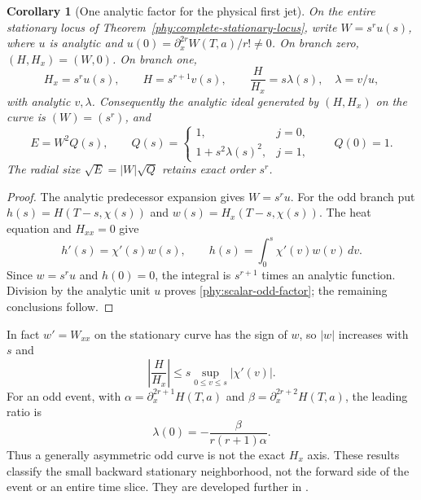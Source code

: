 \documentclass[11pt]{article}
\numberwithin{equation}{section}
\newtheorem{corollary}[theorem]{Corollary}
\theoremstyle{definition}
\theoremstyle{remark}
\begin{document}
\begin{corollary}[One analytic factor for the physical first jet]
\label{phy:scalar-stationary-factor}
On the entire stationary locus of
Theorem~\ref{phy:complete-stationary-locus}, write
$W=s^ru(s)$, where $u$ is analytic and
$u(0)=\partial_x^{2r}W(T,a)/r!\ne0$.
On branch zero, $(H,H_x)=(W,0)$. On branch one,
\begin{equation}
 H_x=s^ru(s),\qquad H=s^{r+1}v(s),\qquad
 \frac{H}{H_x}=s\lambda(s),\quad \lambda=v/u,
 \label{phy:scalar-odd-factor}
\end{equation}
with analytic $v,\lambda$. Consequently the analytic ideal generated
by $(H,H_x)$ on the curve is $(W)=(s^r)$, and
\begin{equation}
 E=W^2Q(s),\qquad
 Q(s)=\begin{cases}1,&j=0,\\1+s^2\lambda(s)^2,&j=1,\end{cases}
 \qquad Q(0)=1.
 \label{phy:scalar-energy-factor}
\end{equation}
The radial size $\sqrt E=|W|\sqrt Q$ retains exact order $s^r$.
\end{corollary}
\begin{proof}
The analytic predecessor expansion gives $W=s^ru$.
For the odd branch put $h(s)=H(T-s,\chi(s))$ and
$w(s)=H_x(T-s,\chi(s))$. The heat equation and $H_{xx}=0$ give
\begin{equation}
 h'(s)=\chi'(s)w(s),\qquad
 h(s)=\int_0^s\chi'(v)w(v)\,dv.
 \label{phy:odd-stationary-transport}
\end{equation}
Since $w=s^ru$ and $h(0)=0$, the integral is $s^{r+1}$ times
an analytic function. Division by the analytic unit $u$ proves
\eqref{phy:scalar-odd-factor}; the remaining conclusions follow.
\end{proof}

In fact $w'=W_{xx}$ on the stationary curve has the sign of $w$,
so $|w|$ increases with $s$ and
\[
 \left|\frac H{H_x}\right|
 \le s\sup_{0\le v\le s}|\chi'(v)|.
\]
For an odd event, with
$\alpha=\partial_x^{2r+1}H(T,a)$ and
$\beta=\partial_x^{2r+2}H(T,a)$, the leading ratio is
\[
 \lambda(0)=-\frac{\beta}{r(r+1)\alpha}.
\]
Thus a generally asymmetric odd curve is not the exact $H_x$ axis.
These results classify the small backward stationary neighborhood,
not the forward side of the event or an entire time slice.
They are developed further in \cite{ThetaScalarGeometry}.
\end{document}
